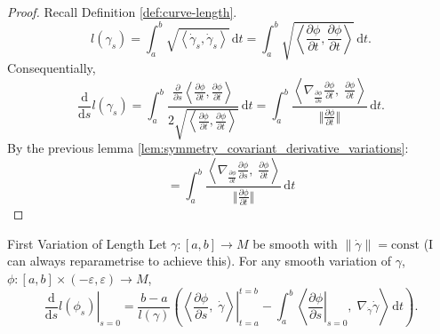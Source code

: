 \begin{proof}
Recall Definition \ref{def:curve-length}.
\[
l(\gamma_s) = \int_a^b \sqrt{\left\langle \dot{\gamma}_s, \dot{\gamma}_s \right\rangle} \,\mathrm{d}t = \int_a^b \sqrt{\left\langle \frac{\partial \phi}{\partial t}, \frac{\partial \phi}{\partial t} \right\rangle} \,\mathrm{d}t.
\]
Consequentially,
\[
\frac{\mathrm{d}}{\mathrm{d}s} l(\gamma_s) = \int_a^b \frac{\frac{\partial}{\partial s}\left\langle \frac{\partial \phi}{\partial t}, \frac{\partial \phi}{\partial t}\right\rangle}{2\sqrt{\left\langle \frac{\partial \phi}{\partial t}, \frac{\partial \phi}{\partial t}\right\rangle}} \,\mathrm{d}t = 
\int_a^b \frac{\left\langle \nabla_{\frac{\partial \phi}{\partial s}} \frac{\partial \phi}{\partial t},\; \frac{\partial \phi}{\partial t}\right\rangle}
{\big\Vert\frac{\partial \phi}{\partial t}\big\Vert} 
\,\mathrm{d}t.
\]
By the previous lemma \ref{lem:symmetry_covariant_derivative_variations}:
\[
= \int_a^b \frac{\left\langle \nabla_{\frac{\partial \phi}{\partial t}} \frac{\partial \phi}{\partial s},\; \frac{\partial \phi}{\partial t}\right\rangle}
{\big\Vert\frac{\partial \phi}{\partial t}\big\Vert} 
\,\mathrm{d}t
\]
\end{proof}


\begin{colortheo}{First Variation of Length}{}
Let $\gamma: [a,b] \to M$ be smooth with $\|\dot{\gamma}\| = \mathrm{const}$ (I can always reparametrise to achieve this). For any smooth variation of $\gamma$, $\phi: [a,b] \times (-\varepsilon, \varepsilon) \to M$,
\begin{equation}
    \label{eq:first_variation}
    \left.\frac{\mathrm{d}}{\mathrm{d}s} l(\phi_s)\right|_{s=0} = \frac{b-a}{l(\gamma)}\left(\left.\left\langle \frac{\partial \phi}{\partial s},\; \dot{\gamma}\right\rangle\right|_{t=a}^{t=b} - \int_a^b \left\langle \left.\frac{\partial \phi}{\partial s}\right|_{s=0},\; \nabla_{\dot{\gamma}} \dot{\gamma}\right\rangle \,\mathrm{d}t\right).
\end{equation}
\end{colortheo}

